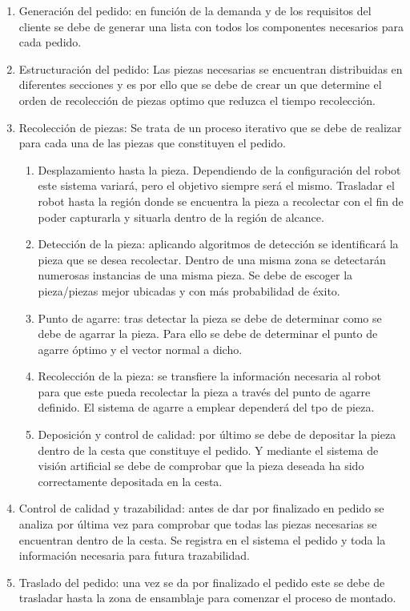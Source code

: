 \begin{enumerate}
\item Generación del pedido: en función de la demanda y de los requisitos del cliente se debe de generar una lista con todos los componentes necesarios para cada pedido.
\item Estructuración del pedido: Las piezas necesarias se encuentran distribuidas en diferentes secciones y es por ello que se debe de crear un  que determine el orden de recolección de piezas optimo que reduzca el tiempo recolección.
\item Recolección de piezas: Se trata de un proceso iterativo que se debe de realizar para cada una de las piezas que constituyen el pedido.
\begin{enumerate}[label*=\arabic*.]
\item Desplazamiento hasta la pieza. Dependiendo de la configuración del robot este sistema variará, pero el objetivo siempre será el mismo. Trasladar el robot hasta la región donde se encuentra la pieza a recolectar con el fin de poder capturarla y situarla dentro de la región de alcance.
\item Detección de la pieza: aplicando algoritmos de detección se identificará la pieza que se desea recolectar. Dentro de una misma zona se detectarán numerosas instancias de una misma pieza. Se debe de escoger la pieza/piezas mejor ubicadas y con más probabilidad de éxito.
\item Punto de agarre: tras detectar la pieza se debe de determinar como se debe de agarrar la pieza. Para ello se debe de determinar el punto de agarre óptimo y el vector normal a dicho.
\item Recolección de la pieza: se transfiere la información necesaria al robot para que este pueda recolectar la pieza a través del punto de agarre definido. El sistema de agarre a emplear dependerá del tpo de pieza.
\item Deposición y control de calidad: por último se debe de depositar la pieza dentro de la cesta que constituye el pedido. Y mediante el sistema de visión artificial se debe de comprobar que la pieza deseada ha sido correctamente depositada en la cesta.
\end{enumerate}
\item Control de calidad y trazabilidad: antes de dar por finalizado en pedido se analiza por última vez para comprobar que todas las piezas necesarias se encuentran dentro de la cesta. Se registra en el sistema el pedido y toda la información necesaria para futura trazabilidad.
\item Traslado del pedido: una vez se da por finalizado el pedido este se debe de trasladar hasta la zona de ensamblaje para comenzar el proceso de montado.
\end{enumerate}

